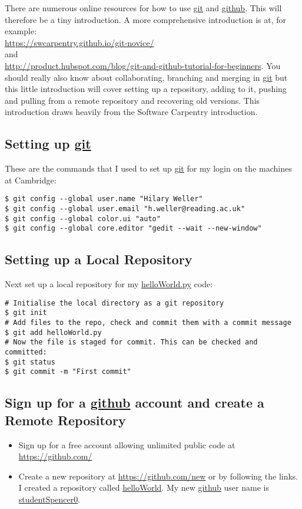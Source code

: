 \pause There are numerous online resources for how to use \url{git}
and \url{github}. This will therefore be a tiny introduction. A more
comprehensive introduction is at, for example:\\
\url{https://swcarpentry.github.io/git-novice/}\\
and\\
\url{http://product.hubspot.com/blog/git-and-github-tutorial-for-beginners}.
You should really also know about collaborating, branching and merging
in \url{git} but this little introduction will cover setting up a
repository, adding to it, pushing and pulling from a remote repository
and recovering old versions. This introduction draws heavily from
the Software Carpentry introduction. \pause 

\subsection{Setting up \protect\url{git}}

These are the commands that I used to set up \url{git} for my login
on the machines at Cambridge:

\begin{lstlisting}
$ git config --global user.name "Hilary Weller"
$ git config --global user.email "h.weller@reading.ac.uk"
$ git config --global color.ui "auto"
$ git config --global core.editor "gedit --wait --new-window"
\end{lstlisting}

\clearpage{}

\subsection{Setting up a Local Repository}

Next set up a local repository for my \url{helloWorld.py} code:

\begin{lstlisting}
# Initialise the local directory as a git repository
$ git init
# Add files to the repo, check and commit them with a commit message
$ git add helloWorld.py
# Now the file is staged for commit. This can be checked and committed:
$ git status
$ git commit -m "First commit"
\end{lstlisting}
\pause 

\subsection{Sign up for a \protect\url{github} account and create a Remote Repository}
\begin{itemize}
\item Sign up for a free account allowing unlimited public code at \url{https://github.com/}
\item Create a new repository at \url{https://github.com/new} or by following
the links. I created a repository called \url{helloWorld}. My new
\url{github} user name is \url{studentSpencer0}. 
\end{itemize}
\pause 

